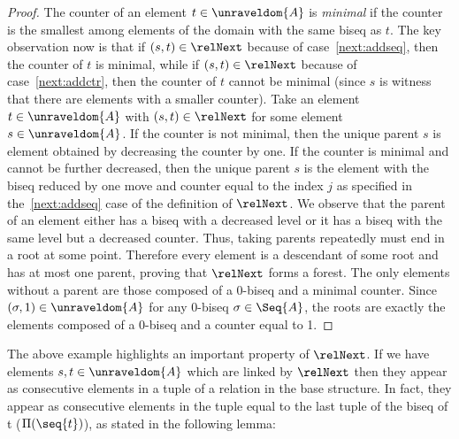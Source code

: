 \begin{proof}
  The counter of an element $t \in \unraveldom{A}$ is \emph{minimal} if the counter is the smallest among elements of the domain with the same biseq as $t$.
  The key observation now is that if $(s,t) \in \relNext$ because of case~\ref{next:addseq}, then the counter of $t$ is minimal, while if $(s,t) \in \relNext$ because of case~\ref{next:addctr}, then the counter of $t$ cannot be minimal (since $s$ is witness that there are elements with a smaller counter).
  Take an element $t \in \unraveldom{A}$ with $(s, t) \in \relNext$ for some element $s \in \unraveldom{A}$.
  If the counter is not minimal, then the unique parent $s$ is element obtained by decreasing the counter by one.
  If the counter is minimal and cannot be further decreased, then the unique parent $s$ is the element with the biseq reduced by one move and counter equal to the index $j$ as specified in the~\ref{next:addseq} case of the definition of $\relNext$.
  We observe that the parent of an element either has a biseq with a decreased level or it has a biseq with the same level but a decreased counter.
  Thus, taking parents repeatedly must end in a root at some point.
  Therefore every element is a descendant of some root and has at most one parent, proving that $\relNext$ forms a forest.
  The only elements without a parent are those composed of a 0-biseq and a minimal counter.
  Since $(\sigma, 1) \in \unraveldom{A}$ for any 0-biseq $\sigma \in \Seq{A}$, the roots are exactly the elements composed of a 0-biseq and a counter equal to 1.
\end{proof}

\noindent
The above example highlights an important property of $\relNext$.
If we have elements $s,t \in \unraveldom{A}$ which are linked by $\relNext$ then they appear as consecutive elements in a tuple of a relation in the base structure.
In fact, they appear as consecutive elements in the tuple equal to the last tuple of the biseq of t (\ie $\Pi(\seq{t})$), as stated in the following lemma:


